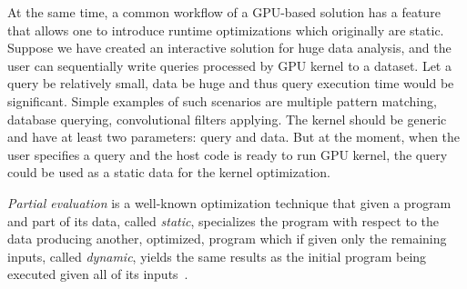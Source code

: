 \documentclass[sigplan]{acmart}\settopmatter{printacmref=false, printfolios=false}
\begin{document}
At the same time, a common workflow of a GPU-based solution has a feature that allows one to introduce runtime optimizations which originally are static.
Suppose %
we have created an interactive solution for huge data analysis,
and the user can sequentially write queries
processed by GPU kernel
to a dataset.
Let a query be relatively small, %
data be huge and thus query execution time would be significant.
Simple examples of such scenarios are multiple pattern matching, database querying, convolutional filters applying.
The kernel should be generic and have at least two parameters: query and data.
But at the moment, when the user specifies a query and the host code is ready to run GPU kernel, the query could be used as a static data for the kernel optimization.

\textit{Partial evaluation} is a well-known optimization technique that given a program and part of its data, called \emph{static}, specializes the program with respect to the data producing another, optimized, program which if given only the remaining inputs, called \emph{dynamic}, yields the same results as the initial program being executed given all of its inputs~\cite{Jones:1993:PEA:153676,PartialEvalPaper}.

\end{document}
